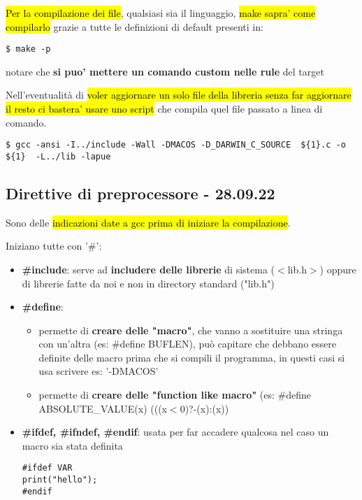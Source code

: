 \hl{Per la compilazione dei file}, qualsiasi sia il linguaggio, \hl{make sapra' come compilarlo} grazie a tutte le definizioni di default presenti in:

\begin{lstlisting}
$ make -p
\end{lstlisting}

notare che \textbf{si puo' mettere un comando custom nelle rule} del target

Nell'eventualità di \hl{voler aggiornare un solo file della libreria senza far aggiornare il resto ci bastera' usare uno script} che compila quel file passato a linea di comando.

\begin{lstlisting}
$ gcc -ansi -I../include -Wall -DMACOS -D_DARWIN_C_SOURCE  ${1}.c -o ${1}  -L../lib -lapue
\end{lstlisting}



\subsection{Direttive di preprocessore - 28.09.22}
Sono delle \hl{indicazioni date a gcc prima di iniziare la compilazione}.

Iniziano tutte con '\#':
\begin{itemize}
	\item \textbf{\#include}: serve ad \textbf{includere delle librerie} di sistema ($<$lib.h$>$) oppure di librerie fatte da noi e non in directory standard ("lib.h")
	\item \textbf{\#define}:
		\begin{itemize}
			\item permette di \textbf{creare delle "macro"}, che vanno a sostituire una stringa con un'altra (es: \#define BUFLEN), può capitare che debbano essere definite delle macro prima che si compili il programma, in questi casi si usa scrivere es: '-DMACOS'
			\item permette di \textbf{creare delle "function like macro"} (es: \#define ABSOLUTE\_VALUE(x) (((x$<$0)?-(x):(x))  
		\end{itemize}
		
	\item \textbf{\#ifdef, \#ifndef, \#endif}: usata per far accadere qualcosa nel caso un macro sia stata definita
\begin{lstlisting}
#ifdef VAR
print("hello");
#endif
\end{lstlisting}

\end{itemize} 

